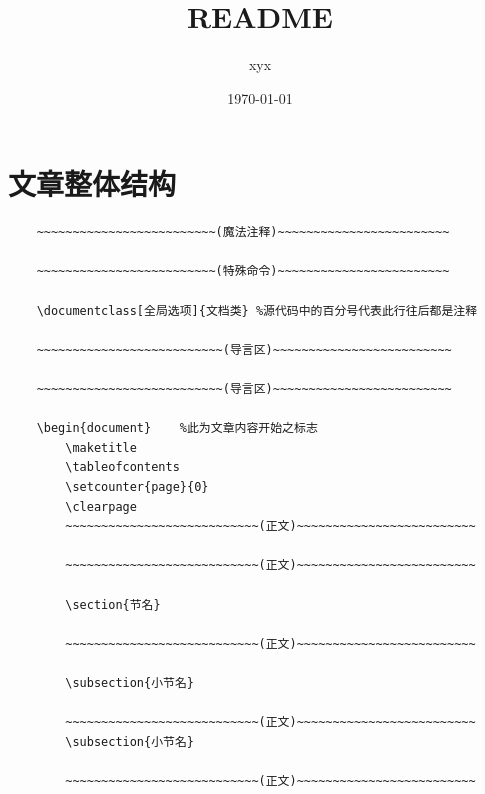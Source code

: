 \documentclass[a4paper,titlepage]{ctexart}
\title{README}
\author{xyx}
\date{\today}
\begin{document}
\maketitle
\tableofcontents
\thispagestyle{empty}
\setcounter{page}{0}
\clearpage

\setcounter{section}{-1}
\section{文章整体结构}

\begin{spacing}{1}
	\begin{framed}
		\begin{verbatim}
	~~~~~~~~~~~~~~~~~~~~~~~~~(魔法注释)~~~~~~~~~~~~~~~~~~~~~~~~
	
	~~~~~~~~~~~~~~~~~~~~~~~~~(特殊命令)~~~~~~~~~~~~~~~~~~~~~~~~	
	
	\documentclass[全局选项]{文档类} %源代码中的百分号代表此行往后都是注释
	
	~~~~~~~~~~~~~~~~~~~~~~~~~~(导言区)~~~~~~~~~~~~~~~~~~~~~~~~~
	
	~~~~~~~~~~~~~~~~~~~~~~~~~~(导言区)~~~~~~~~~~~~~~~~~~~~~~~~~
	
	\begin{document}	%此为文章内容开始之标志
		\maketitle
		\tableofcontents
		\setcounter{page}{0}
		\clearpage
		~~~~~~~~~~~~~~~~~~~~~~~~~~~(正文)~~~~~~~~~~~~~~~~~~~~~~~~~
		
		~~~~~~~~~~~~~~~~~~~~~~~~~~~(正文)~~~~~~~~~~~~~~~~~~~~~~~~~
		
		\section{节名}
		
		~~~~~~~~~~~~~~~~~~~~~~~~~~~(正文)~~~~~~~~~~~~~~~~~~~~~~~~~
		
		\subsection{小节名}
		
		~~~~~~~~~~~~~~~~~~~~~~~~~~~(正文)~~~~~~~~~~~~~~~~~~~~~~~~~
		\subsection{小节名}
		
		~~~~~~~~~~~~~~~~~~~~~~~~~~~(正文)~~~~~~~~~~~~~~~~~~~~~~~~~
		

\end{verbatim}
\end{framed}
\end{spacing}
\end{document}
